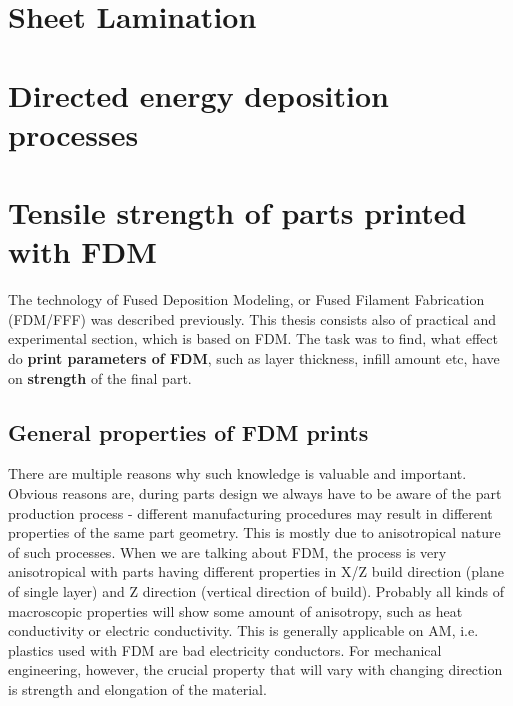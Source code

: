 \documentclass[a4paper, twoside, 11pt]{report}
\begin{document}
\chapter{Sheet Lamination}




\chapter{Directed energy deposition processes}




\chapter{Tensile strength of parts printed with FDM}
The technology of Fused Deposition Modeling, or Fused Filament Fabrication (FDM/FFF) was described previously. This thesis consists also of practical and experimental section, which is based on FDM. The task was to find, what effect do \textbf{print parameters of FDM}, such as layer thickness, infill amount etc, have on \textbf{strength} of the final part.\\
\section{General properties of FDM prints}
There are multiple reasons why such knowledge is valuable and important. Obvious reasons are, during parts design we always have to be aware of the part production process - different manufacturing procedures may result in different properties of the same part geometry. This is mostly due to anisotropical nature of such processes. When we are talking about FDM, the process is very anisotropical with parts having different properties in X/Z build direction (plane of single layer) and Z direction (vertical direction of build). Probably all kinds of macroscopic properties will show some amount of anisotropy, such as heat conductivity or electric conductivity. This is generally applicable on AM, i.e. plastics used with FDM are bad electricity conductors. For mechanical engineering, however, the crucial property that will vary with changing direction is strength and elongation of the material.\\
\end{document}
